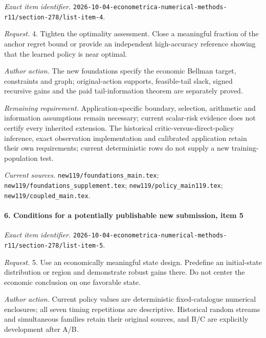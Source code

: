 \emph{Exact item identifier.} \nolinkurl{2026-10-04-econometrica-numerical-methods-r11/section-278/list-item-4}.

\par\emph{Request.} 4. Tighten the optimality assessment. Close a meaningful fraction of the anchor regret bound or provide an independent high-accuracy reference showing that the learned policy is near optimal.

\par\emph{Author action.} The new foundations specify the economic Bellman target, constraints and graph; original-action supports, feasible-tail slack, signed recursive gains and the paid tail-information theorem are separately proved.

\par\emph{Remaining requirement.} Application-specific boundary, selection, arithmetic and information assumptions remain necessary; current scalar-risk evidence does not certify every inherited extension. The historical critic-versus-direct-policy inference, exact observation implementation and calibrated application retain their own requirements; current deterministic rows do not supply a new training-population test.

\par\emph{Current sources.} \nolinkurl{new119/foundations_main.tex}; \nolinkurl{new119/foundations_supplement.tex}; \nolinkurl{new119/policy_main119.tex}; \nolinkurl{new119/coupled_main.tex}.

\paragraph{6. Conditions for a potentially publishable new submission, item 5}

\emph{Exact item identifier.} \nolinkurl{2026-10-04-econometrica-numerical-methods-r11/section-278/list-item-5}.

\par\emph{Request.} 5. Use an economically meaningful state design. Predefine an initial-state distribution or region and demonstrate robust gains there. Do not center the economic conclusion on one favorable state.

\par\emph{Author action.} Current policy values are deterministic fixed-catalogue numerical enclosures; all seven timing repetitions are descriptive. Historical random streams and simultaneous families retain their original sources, and B/\allowbreak{}C are explicitly development after A/\allowbreak{}B.

